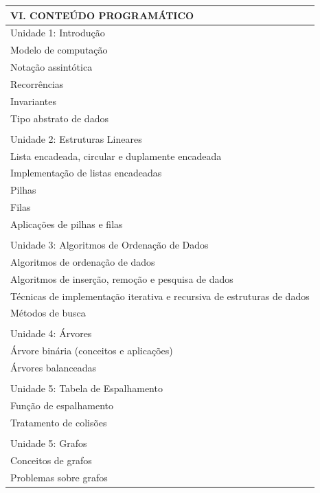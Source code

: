 \documentclass[12pt]{article}
\begin{document}
\begin{longtable}{|L{1.025\textwidth}|} \hline
%
{\bf VI. CONTEÚDO PROGRAMÁTICO } \\ \hline

Unidade 1: Introdução \\
Modelo de computação\\
Notação assintótica\\
Recorrências\\
Invariantes\\
Tipo abstrato de dados\\
\\
Unidade 2: Estruturas Lineares\\
Lista encadeada, circular e duplamente encadeada\\
Implementação de listas encadeadas\\
Pilhas\\
Filas\\
Aplicações de pilhas e filas\\
\\
Unidade 3: Algoritmos de Ordenação de Dados\\
Algoritmos de ordenação de dados\\
Algoritmos de inserção, remoção e pesquisa de dados\\
Técnicas de implementação iterativa e recursiva de estruturas de dados\\
Métodos de busca\\
\\
Unidade 4: Árvores\\
Árvore binária (conceitos e aplicações)\\
Árvores balanceadas\\
\\
Unidade 5: Tabela de Espalhamento\\
Função de espalhamento\\
Tratamento de colisões\\
\\
Unidade 5: Grafos\\
Conceitos de grafos\\
Problemas sobre grafos
\\ \hline
\end{longtable} 
\end{document}
